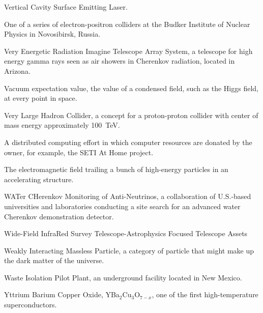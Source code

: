   Vertical Cavity Surface Emitting Laser.

   One of a  series of electron-positron colliders at the
Budker Institute of Nuclear Physics in Novosibirsk, Russia.

 Very Energetic Radiation Imagine Telescope Array 
System,  a telescope for high energy gamma rays seen as air showers
in Cherenkov radiation, located in Arizona.

 Vacuum expectation value, the value of a condensed 
field, such as the Higgs field, at every point in space.

 Very Large Hadron Collider, a concept for a proton-proton
collider with center of mass energy approximately 100~TeV.

  A distributed computing effort in which computer resources
   are donated by the owner, for example, the SETI At Home project.

   The electromagnetic field trailing a bunch of
high-energy particles in an accelerating structure.

 WATer CHerenkov Monitoring of Anti-Neutrinos, a
collaboration of U.S.-based universities and laboratories conducting
a site search for an advanced water Cherenkov demonstration detector.

  Wide-Field InfraRed Survey Telescope-Astrophysics Focused
Telescope Assets

 Weakly Interacting Massless Particle, a category of
particle that might make up the dark matter of the universe.

  Waste Isolation Pilot Plant, an underground facility
located in New Mexico.

   Yttrium Barium Copper Oxide,
YBa$_2$Cu$_3$O$_{7-x}$, one of the first high-temperature 
superconductors.